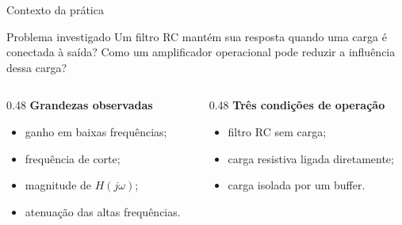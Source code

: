 \begin{frame}{Contexto da prática}
  \begin{block}{Problema investigado}
    Um filtro RC mantém sua resposta quando uma carga é conectada à saída?
    Como um amplificador operacional pode reduzir a influência dessa carga?
  \end{block}

  \begin{columns}[T,onlytextwidth]
    \begin{column}{0.48\textwidth}
      \textbf{Grandezas observadas}
      \begin{itemize}
        \item ganho em baixas frequências;
        \item frequência de corte;
        \item magnitude de $H(j\omega)$;
        \item atenuação das altas frequências.
      \end{itemize}
    \end{column}
    \begin{column}{0.48\textwidth}
      \textbf{Três condições de operação}
      \begin{itemize}
        \item filtro RC sem carga;
        \item carga resistiva ligada diretamente;
        \item carga isolada por um buffer.
      \end{itemize}
    \end{column}
  \end{columns}
\end{frame}
